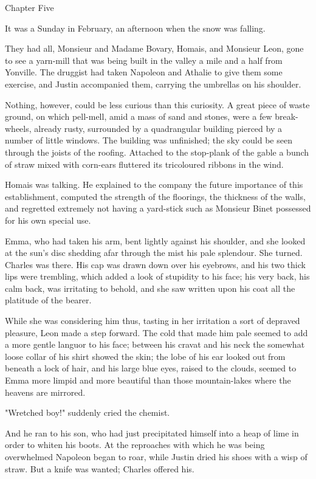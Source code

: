 \documentclass[11pt,twocolumn]{ltugboat}
\begin{document}
Chapter Five

It was a Sunday in February, an afternoon when the snow was falling.

They had all, Monsieur and Madame Bovary, Homais, and Monsieur Leon,
gone to see a yarn-mill that was being built in the valley a mile and a
half from Yonville. The druggist had taken Napoleon and Athalie to give
them some exercise, and Justin accompanied them, carrying the umbrellas
on his shoulder.

Nothing, however, could be less curious than this curiosity. A great
piece of waste ground, on which pell-mell, amid a mass of sand and
stones, were a few break-wheels, already rusty, surrounded by a
quadrangular building pierced by a number of little windows. The
building was unfinished; the sky could be seen through the joists of the
roofing. Attached to the stop-plank of the gable a bunch of straw mixed
with corn-ears fluttered its tricoloured ribbons in the wind.

Homais was talking. He explained to the company the future importance
of this establishment, computed the strength of the floorings, the
thickness of the walls, and regretted extremely not having a yard-stick
such as Monsieur Binet possessed for his own special use.

Emma, who had taken his arm, bent lightly against his shoulder, and
she looked at the sun's disc shedding afar through the mist his pale
splendour. She turned. Charles was there. His cap was drawn down over
his eyebrows, and his two thick lips were trembling, which added a look
of stupidity to his face; his very back, his calm back, was irritating
to behold, and she saw written upon his coat all the platitude of the
bearer.

While she was considering him thus, tasting in her irritation a sort of
depraved pleasure, Leon made a step forward. The cold that made him pale
seemed to add a more gentle languor to his face; between his cravat and
his neck the somewhat loose collar of his shirt showed the skin; the
lobe of his ear looked out from beneath a lock of hair, and his large
blue eyes, raised to the clouds, seemed to Emma more limpid and more
beautiful than those mountain-lakes where the heavens are mirrored.

"Wretched boy!" suddenly cried the chemist.

And he ran to his son, who had just precipitated himself into a heap of
lime in order to whiten his boots. At the reproaches with which he was
being overwhelmed Napoleon began to roar, while Justin dried his shoes
with a wisp of straw. But a knife was wanted; Charles offered his.
\end{document}

